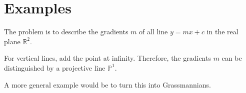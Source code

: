 
\section{Examples}

\begin{example}
    \label{example-blow-up-gradient}
    The problem is to describe the gradients $m$ of
    all line $y = mx + c$ in the real plane $\mathbb{R}^2$.

    For vertical lines, add the point at infinity.
    Therefore, the gradients $m$ can be distinguished 
    by a projective line $\mathbb{P}^1$.

    A more general example would be to turn this into
    Grassmannians.
\end{example}